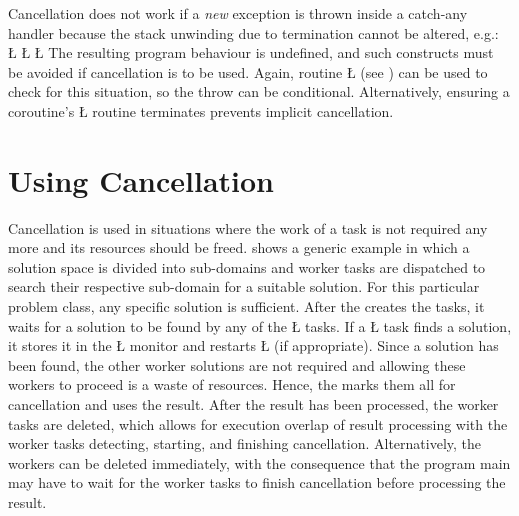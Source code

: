 \documentclass[openright,twoside]{report}
\begin{document}
Cancellation does not work if a \emph{new} exception is thrown inside a catch-any handler because the stack unwinding due to termination cannot be altered, e.g.:
\LGinlinefalse\LGbegin\lgrinde
\L{}
\L{\LB{}}
\L{\LB{\}}}
\endlgrinde\LGend
The resulting program behaviour is undefined, and such constructs must be avoided if cancellation is to be used.
Again, routine \LGinlinetrue\LGbegin\lgrinde\L{}\endlgrinde\LGend{} (see ) can be used to check for this situation, so the throw can be conditional.
Alternatively, ensuring a coroutine's \LGinlinetrue\LGbegin\lgrinde\L{}\endlgrinde\LGend{} routine terminates prevents implicit cancellation.


\section{Using Cancellation}

Cancellation is used in situations where the work of a task is not required any more and its resources should be freed.
 shows a generic example in which a solution space is divided into sub-domains and worker tasks are dispatched to search their respective sub-domain for a suitable solution.
For this particular problem class, any specific solution is sufficient.
After the  creates the tasks, it waits for a solution to be found by any of the \LGinlinetrue\LGbegin\lgrinde\L{}\endlgrinde\LGend{} tasks.
If a \LGinlinetrue\LGbegin\lgrinde\L{}\endlgrinde\LGend{} task finds a solution, it stores it in the \LGinlinetrue\LGbegin\lgrinde\L{}\endlgrinde\LGend{} monitor and restarts \LGinlinetrue\LGbegin\lgrinde\L{}\endlgrinde\LGend{} (if appropriate).
Since a solution has been found, the other worker solutions are not required and allowing these workers to proceed is a waste of resources.
Hence, the  marks them all for cancellation and uses the result.
After the result has been processed, the worker tasks are deleted, which allows for execution overlap of result processing with the worker tasks detecting, starting, and finishing cancellation.
Alternatively, the workers can be deleted immediately, with the consequence that the program main may have to wait for the worker tasks to finish cancellation before processing the result.
\end{document}
